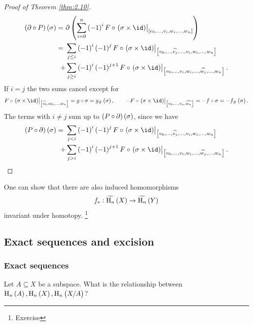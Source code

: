 \begin{proof}[Proof of Theorem \ref{thm:2.10}]
\begin{align*}
\br{\partial \circ P}\br{\sigma}
= \ & \partial\br{\sum_{i = 0}^n \br{-1}^iF \circ \eval{\br{\sigma \times \id}}_{\sbr{v_0, \dots, v_i, w_i, \dots, w_n}}} \\
= \ & \sum_{j \le i} \br{-1}^i\br{-1}^jF \circ \eval{\br{\sigma \times \id}}_{\sbr{v_0, \dots, \widehat{v_j}, \dots, v_i, w_i, \dots, w_n}} \\
+ & \sum_{j \ge i} \br{-1}^i\br{-1}^{j + 1}F \circ \eval{\br{\sigma \times \id}}_{\sbr{v_0, \dots, v_i, w_i, \dots, \widehat{w_j}, \dots, w_n}}.
\end{align*}
If $ i = j $ the two sums cancel except for
$$ F \circ \eval{\br{\sigma \times \id}}_{\sbr{\widehat{v_0}, w_0, \dots, w_n}} = g \circ \sigma = g_\#\br{\sigma}, \qquad -F \circ \eval{\br{\sigma \times \id}}_{\sbr{v_0, \dots, v_n, \widehat{w_n}}} = -f \circ \sigma = -f_\#\br{\sigma}. $$
The terms with $ i \ne j $ sum up to $ \br{P \circ \partial}\br{\sigma} $, since we have
\begin{align*}
\br{P \circ \partial}\br{\sigma}
= \ & \sum_{j < i} \br{-1}^i\br{-1}^jF \circ \eval{\br{\sigma \times \id}}_{\sbr{v_0, \dots, \widehat{v_j}, \dots, v_i, w_i, \dots, w_n}} \\
+ & \sum_{j > i} \br{-1}^i\br{-1}^{j + 1}F \circ \eval{\br{\sigma \times \id}}_{\sbr{v_0, \dots, v_i, w_i, \dots, \widehat{w_j}, \dots, w_n}}.
\end{align*}
\end{proof}


\begin{remark*}
One can show that there are also induced homomorphisms
$$ f_* : \widetilde{\H_n}\br{X} \to \widetilde{\H_n}\br{Y} $$
invariant under homotopy. \footnote{Exercise}
\end{remark*}

\pagebreak

\subsection{Exact sequences and excision}

\subsubsection{Exact sequences}

Let $ A \subseteq X $ be a subspace. What is the relationship between $ \H_n\br{A}, \H_n\br{X}, \H_n\br{X / A} $?

